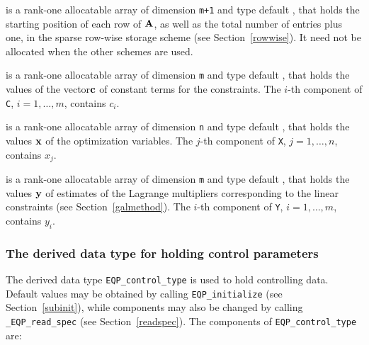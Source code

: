 \documentclass{galahad}
\newcommand{\packagename}{EQP}
\newcommand{\fullpackagename}{\libraryname\_\packagename}
\begin{document}
\begin{description}
\begin{description}
 is a rank-one allocatable array of dimension {\tt m+1} and type 
default \integer, that holds the 
starting position of each row of ${\mathbf{A}}$, as well
as the total number of entries plus one, in the sparse row-wise storage
scheme (see Section~\ref{rowwise}). It need not be allocated when the
other schemes are used.

\end{description}

 is a rank-one allocatable array of dimension {\tt m} and type default 
\realdp, that holds the values of the vector${\mathbf{c}}$ of constant terms
for the constraints.
The $i$-th component of {\tt C}, $i = 1,  \ldots ,  m$, contains 
$c_{i}$.  

 is a rank-one allocatable array of dimension {\tt n} and type 
default \realdp, 
that holds the values ${\mathbf{x}}$ of the optimization variables.
The $j$-th component of {\tt X}, $j = 1,  \ldots , n$, contains $x_{j}$.  

 is a rank-one allocatable array of dimension {\tt m} and type 
default \realdp, that holds
the values ${\mathbf{y}}$ of estimates  of the Lagrange multipliers
corresponding to the linear constraints (see Section~\ref{galmethod}).
The $i$-th component of {\tt Y}, $i = 1,  \ldots ,  m$, contains $y_{i}$.  

\end{description}


\subsubsection{The derived data type for holding control 
 parameters}\label{typecontrol}
The derived data type 
{\tt \packagename\_control\_type} 
is used to hold controlling data. Default values may be obtained by calling 
{\tt \packagename\_initialize}
(see Section~\ref{subinit}),
while components may also be changed by calling 
{\tt \fullpackagename\_read\-\_spec}
(see Section~\ref{readspec}). 
The components of 
{\tt \packagename\_control\_type} 
are:



\end{document}
